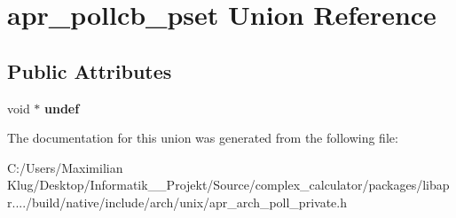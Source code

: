 \hypertarget{unionapr__pollcb__pset}{}\section{apr\+\_\+pollcb\+\_\+pset Union Reference}
\label{unionapr__pollcb__pset}
\subsection*{Public Attributes}
\begin{DoxyCompactItemize}
\item 
\mbox{\label{unionapr__pollcb__pset_ab06f3ab237e5b81592ad4eda05220f29}} 
void $\ast$ {\bfseries undef}
\end{DoxyCompactItemize}


The documentation for this union was generated from the following file\+:\begin{DoxyCompactItemize}
\item 
C\+:/\+Users/\+Maximilian Klug/\+Desktop/\+Informatik\+\_\+\_\+\+Projekt/\+Source/complex\+\_\+calculator/packages/libapr..../build/native/include/arch/unix/apr\+\_\+arch\+\_\+poll\+\_\+private.\+h\end{DoxyCompactItemize}
